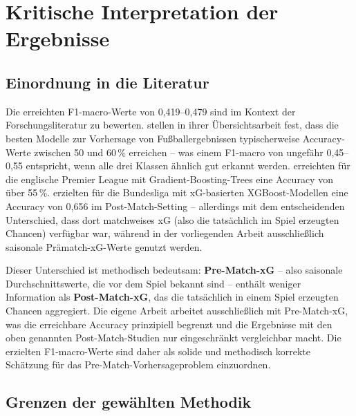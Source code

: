 \section{Kritische Interpretation der Ergebnisse}
\label{sec:eval-kritisch}

\subsection{Einordnung in die Literatur}

Die erreichten F1-macro-Werte von 0,419--0,479 sind im Kontext
der Forschungsliteratur zu bewerten. \textcite{BunkerThabtah2019} stellen
in ihrer Übersichtsarbeit fest, dass die besten Modelle zur Vorhersage
von Fußballergebnissen typischerweise Accuracy-Werte zwischen 50 und 60\,\%
erreichen -- was einem F1-macro von ungefähr 0,45--0,55 entspricht,
wenn alle drei Klassen ähnlich gut erkannt werden. \textcite{HubacekSourekZelezny2019}
erreichten für die englische Premier League mit Gradient-Boosting-Trees
eine Accuracy von über 55\,\%. \textcite{ForcherEtAl2025} erzielten für
die Bundesliga mit xG-basierten XGBoost-Modellen eine Accuracy von 0,656
im Post-Match-Setting -- allerdings mit dem entscheidenden Unterschied,
dass dort matchweises xG (also die tatsächlich im Spiel erzeugten Chancen)
verfügbar war, während in der vorliegenden Arbeit ausschließlich saisonale
Prämatch-xG-Werte genutzt werden.

Dieser Unterschied ist methodisch bedeutsam: \textbf{Pre-Match-xG} --
also saisonale Durchschnittswerte, die vor dem Spiel bekannt sind --
enthält weniger Information als \textbf{Post-Match-xG}, das die
tatsächlich in einem Spiel erzeugten Chancen aggregiert. Die eigene
Arbeit arbeitet ausschließlich mit Pre-Match-xG, was die erreichbare
Accuracy prinzipiell begrenzt und die Ergebnisse mit den oben genannten
Post-Match-Studien nur eingeschränkt vergleichbar macht. Die erzielten
F1-macro-Werte sind daher als solide und methodisch korrekte Schätzung
für das Pre-Match-Vorhersageproblem einzuordnen.

\subsection{Grenzen der gewählten Methodik}

